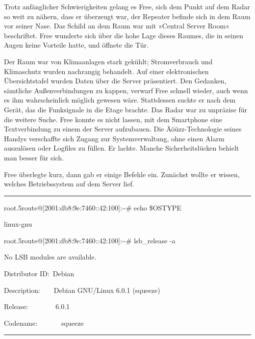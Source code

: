 Trotz anfänglicher Schwierigkeiten gelang es Free, sich dem Punkt auf dem Radar so weit zu nähern, dass er überzeugt war, der Repeater befinde sich in dem Raum vor seiner Nase. Das Schild an dem Raum war mit »Central Server Room« beschriftet. Free wunderte sich über die hohe Lage dieses Raumes, die in seinen Augen keine Vorteile hatte, und öffnete die Tür.

Der Raum war von Klimaanlagen stark gekühlt; Stromverbrauch und Klimaschutz wurden nachrangig behandelt. Auf einer elektronischen Übersichtstafel wurden Daten über die Server präsentiert. Den Gedanken, sämtliche Außenverbindungen zu kappen, verwarf Free schnell wieder, auch wenn es ihm wahrscheinlich möglich gewesen wäre. Stattdessen suchte er nach dem Gerät, das die Funksignale in die Etage brachte. Das Radar war zu unpräzise für die weitere Suche. Free konnte es nicht lassen, mit dem Smartphone eine Textverbindung zu einem der Server aufzubauen. Die Äöüzz-Technologie seines Handys verschaffte sich Zugang zur Systemverwaltung, ohne einen Alarm auszulösen oder Logfiles zu füllen. Er lachte. Manche Sicherheitslücken behielt man besser für sich.

Free überlegte kurz, dann gab er einige Befehle ein. Zunächst wollte er wissen, welches Betriebssystem auf dem Server lief.

\noindent \parbox{\textwidth}{ \vspace{3ex} \hrule \vspace{3ex}

    \begin{footnotesize}
    \begin{ttfamily}

\noindent root.5route@[2001:db8:9e:7460::42:100]:\~{}\#  echo \$OSTYPE

\noindent linux-gnu

\noindent root.5route@[2001:db8:9e:7460::42:100]:\~{}\#  lsb\_release -a

\noindent No LSB modules are available.

\noindent Distributor ID:~Debian

\noindent Description:~~~~Debian GNU/Linux 6.0.1 (squeeze)

\noindent Release:~~~~~~~~6.0.1

\noindent Codename:~~~~~~~squeeze

    \end{ttfamily}
    \end{footnotesize}

\vspace{3ex} \hrule \vspace{3ex} }

